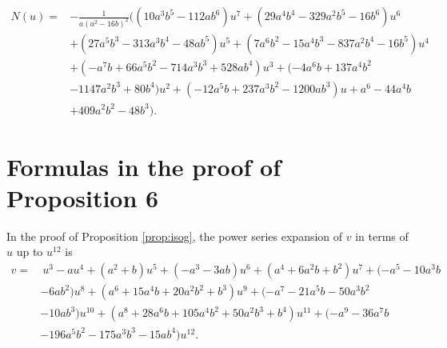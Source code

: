 \documentclass{gtpart}
\theoremstyle{definition}
\theoremstyle{remark}
\begin{document}
\begin{equation*}
\begin{split}
 N(u) = & -\frac{1}{a (a^2 - 16 b)^2} \big( (10 a^3 b^5 - 112 a b^6) u^7 + (29 a^4 b^4 - 329 a^2 b^5 - 16 b^6) u^6 \\
        & + (27 a^5 b^3 - 313 a^3 b^4 - 48 a b^5 ) u^5 + (7 a^6 b^2 - 15 a^4 b^3 - 837 a^2 b^4 - 16 b^5) u^4 \\
        & + (-a^7 b + 66 a^5 b^2 - 714 a^3 b^3 + 528 a b^4) u^3 + (-4 a^6 b + 137 a^4 b^2 \\
        & - 1147 a^2 b^3 + 80 b^4) u^2 + (-12 a^5 b + 237 a^3 b^2 - 1200 a b^3) u + a^6 - 44 a^4 b \\
        & + 409 a^2 b^2 - 48 b^3 \big).  
\end{split}
\end{equation*}


\section{Formulas in the proof of Proposition 6}
\label{apx:isog}

In the proof of Proposition \ref{prop:isog}, the power series expansion 
of $v$ in terms of $u$ up to $u^{12}$ is 
\begin{equation*}
\begin{split}
 v = & ~ u^3 - a u^4 + (a^2 + b) u^5 + (-a^3 - 3 a b) u^6 + (a^4 + 6 a^2 b + b^2) u^7 + (-a^5 - 10 a^3 b \\
     & - 6 a b^2) u^8 + (a^6 + 15 a^4 b + 20 a^2 b^2 + b^3) u^9 + (-a^7 - 21 a^5 b - 50 a^3 b^2 \\
     & - 10 a b^3) u^{10} + (a^8 + 28 a^6 b + 105 a^4 b^2 + 50 a^2 b^3 + b^4) u^{11} + (-a^9 - 36 a^7 b \\
     & - 196 a^5 b^2 - 175 a^3 b^3 - 15 a b^4) u^{12}.  
\end{split}
\end{equation*}
\end{document}
